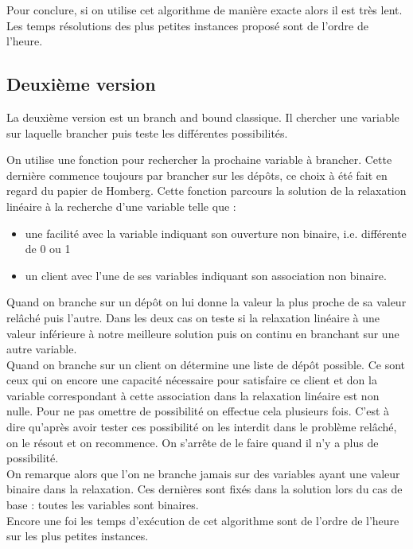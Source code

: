 \documentclass[12pt,a4paper]{article}
\begin{document}
Pour conclure, si on utilise cet algorithme de manière exacte alors il est très lent. Les temps résolutions des plus petites instances proposé sont de l'ordre de l'heure.\\
 
\subsection{Deuxième version}

La deuxième version est un branch and bound classique. Il chercher une variable sur laquelle brancher puis teste les différentes possibilités.

On utilise une fonction pour rechercher la prochaine variable à brancher. Cette dernière commence toujours par brancher sur les dépôts, ce choix à été fait en regard du papier de Homberg. Cette fonction parcours la solution de la relaxation linéaire à la recherche d'une variable telle que :
\begin{itemize}
\item
une facilité avec la variable indiquant son ouverture non binaire, i.e. différente de 0 ou 1
\item
un client avec l'une de ses variables indiquant son association non binaire.
\end{itemize}

Quand on branche sur un dépôt on lui donne la valeur la plus proche de sa valeur relâché puis l'autre. Dans les deux cas on teste si la relaxation linéaire à une valeur inférieure à notre meilleure solution puis on continu en branchant sur une autre variable.\\

Quand on branche sur un client on détermine une liste de dépôt possible. Ce sont ceux qui on encore une capacité nécessaire pour satisfaire ce client et don la variable correspondant à cette association dans la relaxation linéaire est non nulle. Pour ne pas omettre de possibilité on effectue cela plusieurs fois. C'est à dire qu'après avoir tester ces possibilité on les interdit dans le problème relâché, on le résout et on recommence. On s’arrête de le faire quand il n'y a plus de possibilité.\\

On remarque alors que l'on ne branche jamais sur des variables ayant une valeur binaire dans la relaxation. Ces dernières sont fixés dans la solution lors du cas de base : toutes les variables sont binaires.\\

Encore une foi les temps d’exécution de cet algorithme sont de l'ordre de l'heure sur les plus petites instances.\\
\end{document}
